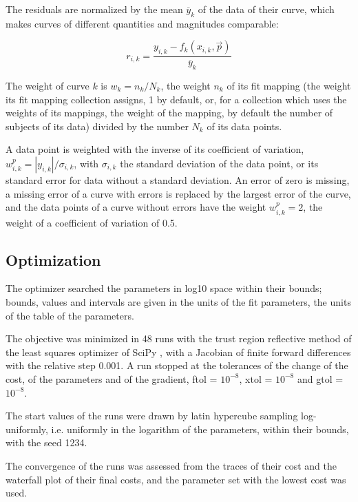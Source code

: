 \documentclass{article}
\begin{document}
The residuals are normalized by the mean $\overline{y}_k$ of the data of their curve, which makes curves of different quantities and magnitudes comparable:

\begin{equation}
r_{i,k} = \frac{y_{i,k} - f_k(x_{i,k}, \vec{p})}{\overline{y}_k}
\end{equation}

The weight of curve $k$ is $w_k = n_k / N_k$, the weight $n_k$ of its fit mapping (the weight its fit mapping collection assigns, 1 by default, or, for a collection which uses the weights of its mappings, the weight of the mapping, by default the number of subjects of its data) divided by the number $N_k$ of its data points.

A data point is weighted with the inverse of its coefficient of variation, $w^{p}_{i,k} = |y_{i,k}| / \sigma_{i,k}$, with $\sigma_{i,k}$ the standard deviation of the data point, or its standard error for data without a standard deviation. An error of zero is missing, a missing error of a curve with errors is replaced by the largest error of the curve, and the data points of a curve without errors have the weight $w^{p}_{i,k} = 2$, the weight of a coefficient of variation of 0.5.

\subsection{Optimization}

The optimizer searched the parameters in log10 space within their bounds; bounds, values and intervals are given in the units of the fit parameters, the units of the table of the parameters.

The objective was minimized in 48 runs with the trust region reflective method \cite{Branch1999} of the least squares optimizer of SciPy \cite{Virtanen2020}, with a Jacobian of finite forward differences with the relative step 0.001. A run stopped at the tolerances of the change of the cost, of the parameters and of the gradient, ftol = $10^{-8}$, xtol = $10^{-8}$ and gtol = $10^{-8}$.

The start values of the runs were drawn by latin hypercube sampling \cite{McKay1979} log-uniformly, i.e. uniformly in the logarithm of the parameters, within their bounds, with the seed 1234.

The convergence of the runs was assessed from the traces of their cost and the waterfall plot of their final costs, and the parameter set with the lowest cost was used.
\end{document}
